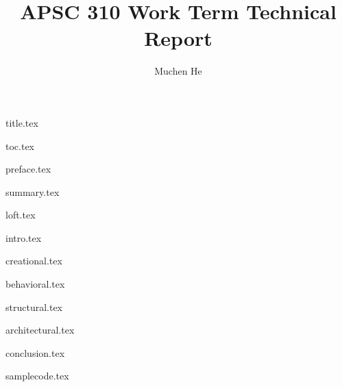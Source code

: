 \documentclass[10pt,letterpaper]{article}
\author{Muchen He}
\title{APSC 310 Work Term Technical Report}
\begin{document}
{title.tex}

{toc.tex}

{preface.tex}

{summary.tex}

{loft.tex}

\setcounter{page}{1}
\setcounter{section}{0}

{intro.tex}

{creational.tex}

{behavioral.tex}

{structural.tex}

{architectural.tex}

{conclusion.tex}

\clearpage
{}
% 



\clearpage
\appendix
{samplecode.tex}

\end{document}
